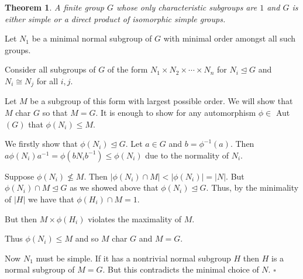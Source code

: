 \documentclass[10pt]{article}
\newtheorem{theorem}{Theorem}[section]
\newenvironment{proof}[1][Proof]{\begin{trivlist}
\item[\hskip \labelsep {\itshape #1}]}{\end{trivlist}}
\begin{document}
\begin{theorem}
A finite group $G$ whose only characteristic subgroups are $1$ and $G$ is either simple or a direct product of isomorphic simple groups.
\end{theorem}

\begin{proof}
Let $N_1$ be a minimal normal subgroup of $G$ with minimal order amongst all such groups. 

Consider all subgroups of $G$ of the form $N_1\times N_2\times \cdots \times N_n$ for $N_i \mathrel{\unlhd} G$ and $N_i \cong N_j$ for all $i, j$.

Let $M$ be a subgroup of this form with largest possible order. We will show that $M$ char $G$ so that $M = G$. It is enough to show for any automorphism $\phi \in$ Aut$(G)$ that $\phi(N_i) \leq M$.

We firstly show that $\phi(N_i) \mathrel{\unlhd} G$. Let $a \in G$ and $b = \phi^{-1}(a)$. Then $a\phi(N_i)a^{-1} = \phi(bN_ib^{-1}) \leq \phi(N_i)$ due to the normality of $N_i$.

Suppose $\phi(N_i) \not\leq M$. Then $|\phi(N_i)\cap M| < |\phi(N_i)| = |N|$. But $\phi(N_i)\cap M \mathrel{\unlhd} G$ as we showed above that $\phi(N_i) \mathrel{\unlhd} G$. Thus, by the minimality of $|H|$ we have that $\phi(H_i)\cap M = 1$.

But then $M\times \phi(H_i)$ violates the maximality of $M$.

Thus $\phi(N_i) \leq M$ and so $M$ char $G$ and $M = G$.

Now $N_1$ must be simple. If it has a nontrivial normal subgroup $H$ then $H$ is a normal subgroup of $M = G$. But this contradicts the minimal choice of $N$. $\square$
\end{proof}

\end{document}
